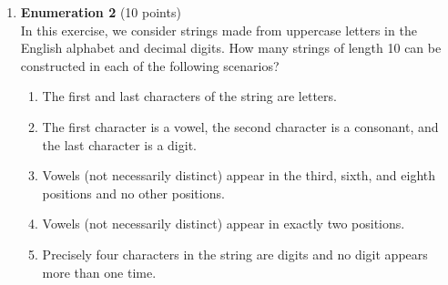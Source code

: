 \begin{enumerate}
  \item \textbf{Enumeration 2} (10 points)\\
  In this exercise, we consider strings made from uppercase letters in the English alphabet and decimal digits. How many strings of length 10 can be constructed in each of the following scenarios?
  \begin{enumerate}[label=\alph*.]
    \item The first and last characters of the string are letters.
    \begin{subanswer}
    \end{subanswer}
    \item The first character is a vowel, the second character is a consonant, and the last character is a digit.
    \begin{subanswer}
    \end{subanswer}
    \item Vowels (not necessarily distinct) appear in the third, sixth, and eighth positions and no other positions.
    \begin{subanswer}
    \end{subanswer}
    \item Vowels (not necessarily distinct) appear in exactly two positions.
    \begin{subanswer}
    \end{subanswer}
    \item Precisely four characters in the string are digits and no digit appears more than one time.
    \begin{subanswer}
    \end{subanswer}
  \end{enumerate}

  \newpage


\end{enumerate}
